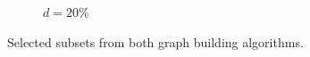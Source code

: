 \begin{figure}[!h]
\begin{subfigure}[b]{0.24\linewidth}
  	\caption{\small $d=20\%$} 
  	\label{fig:20_sweden} 
  	\vspace{4ex}
  \end{subfigure}
  \caption[Selected subsets from both graph building algorithms]{Selected subsets from both graph building algorithms.}
  \label{fig:sweden_dist} 
\end{figure}

